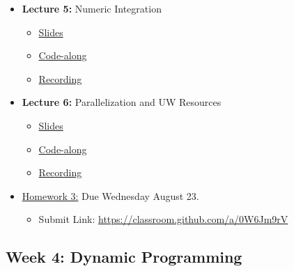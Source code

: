 \documentclass[
]{book}
\providecommand{\tightlist}{%
  \setlength{\itemsep}{0pt}\setlength{\parskip}{0pt}}
\begin{document}
\begin{itemize}
\tightlist
\item
  \textbf{Lecture 5:} Numeric Integration

  \begin{itemize}
  \tightlist
  \item
    \href{https://kevinghunt.github.io/ComputationCamp/lectures/Lecture5.html}{Slides}
  \item
    \href{https://kevinghunt.github.io/ComputationCamp/codealongs/CodeAlong5.jl}{Code-along}
  \item
    \href{https://uwmadison.zoom.us/rec/share/Rc-Mno_HDmfyakQGBhzxhbOjYIxXkX8ka4vkksy2p5Y-lxDZCJ2x08U8ja6LzMEV.54CVfkLcQhOLID_m}{Recording}
  \end{itemize}
\item
  \textbf{Lecture 6:} Parallelization and UW Resources

  \begin{itemize}
  \tightlist
  \item
    \href{https://kevinghunt.github.io/ComputationCamp/lectures/Lecture6.html}{Slides}
  \item
    \href{https://kevinghunt.github.io/ComputationCamp/codealongs/CodeAlong6.jl}{Code-along}
  \item
    \href{https://uwmadison.zoom.us/rec/share/ZkkEGxop9imwlGAfhqobNSm9M5uRupUj3DqE1xGMBTo7-ZmJKzO92OSKJ5d_I7JM.KK3JK7rsgIHu7yuc}{Recording}
  \end{itemize}
\item
  \href{https://kevinghunt.github.io/ComputationCamp/homeworks/homework3.html}{Homework 3:} Due Wednesday August 23.

  \begin{itemize}
  \tightlist
  \item
    Submit Link: \url{https://classroom.github.com/a/0W6Jm9rV}
  \end{itemize}
\end{itemize}

\hypertarget{week-4-dynamic-programming}{%
\subsection{Week 4: Dynamic Programming}\label{week-4-dynamic-programming}}
\end{document}
